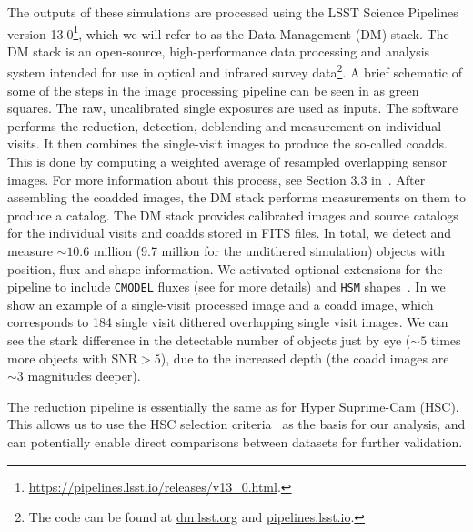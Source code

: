 \documentclass[a4paper,fleqn,usenatbib]{mnras}
\begin{document}
The outputs of these simulations are processed using the LSST Science Pipelines~\citep{Overview,ScienceBook,WhitePaper,2015arXiv151207914J,2018PASJ...70S...5B} version 13.0\footnote{\url{https://pipelines.lsst.io/releases/v13_0.html}.}, which we will refer to as the Data Management (DM) stack. The DM stack is an open-source, high-performance data processing and analysis system intended for use in optical and infrared survey data\footnote{The code can be found at \url{dm.lsst.org} and \url{pipelines.lsst.io}.}. A brief schematic of some of the steps in the image processing pipeline can be seen in  as green squares. The raw, uncalibrated single exposures are used as inputs. The software performs the reduction, detection, deblending and measurement on individual visits. It then combines the single-visit images to produce the so-called coadds. This is done by computing a weighted average of resampled overlapping sensor images. For more information about this process, see Section 3.3 in~\citet{2018PASJ...70S...5B}. After assembling the coadded images, the DM stack performs measurements on them to produce a catalog. The DM stack provides calibrated images and source catalogs for the individual visits and coadds stored in FITS files. In total, we detect and measure $\sim 10.6$ million  (9.7 million for the undithered simulation) objects with position, flux and shape information. We activated optional extensions for the pipeline to include \texttt{CMODEL} fluxes (see \citealt{2018PASJ...70S...5B} for more details) and \texttt{HSM} shapes~\citep{2003MNRAS.343..459H,2005MNRAS.361.1287M}. In  we show an example of a single-visit processed image and a coadd image, which corresponds to 184 single visit dithered overlapping single visit images. We can see the stark difference in the detectable number of objects just by eye ($\sim 5$ times more objects with SNR$>5$), due to the increased depth (the coadd images are $\sim 3$ magnitudes deeper).

The reduction pipeline is essentially the same as for Hyper Suprime-Cam (HSC). This allows us to use the HSC selection criteria~\citep[Sec. 5.1]{2018PASJ...70S..25M} as the basis for our analysis, and can potentially enable direct comparisons between datasets for further validation.
\end{document}
